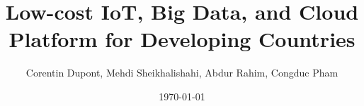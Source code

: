 \documentclass{llncs}
\begin{document}
\title{Low-cost IoT, Big Data, and Cloud Platform for Developing Countries}

\author{Corentin Dupont, Mehdi Sheikhalishahi, Abdur Rahim, Congduc Pham} 



\date{\today}

\maketitle

\begin{abstract}

\end{abstract}










%
%
%






\end{document}
